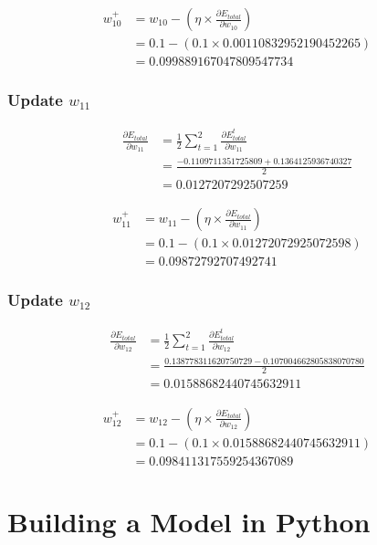 \documentclass{article}
\begin{document}
\begin{align*}
    w_{{10}}^{+} &= w_{10} - (\eta \times \frac{\partial E_{total}}{\partial w_{10}}) \\
    & = 0.1 - (0.1 \times 0.00110832952190452265) \\
    & = 0.099889167047809547734
\end{align*}
\subsubsection{Update $w_{11}$}
\begin{align*}
    \frac{\partial E_{total}}{\partial w_{11}} & =
        \frac{1}{2}
            \sum_{t=1}^{2}{
                \frac{\partial E_{total}^{t}}{\partial w_{11}}} \\
    & = \frac{-0.1109711351725809 + 0.1364125936740327}{2} \\
    & = 0.0127207292507259
\end{align*}

\begin{align*}
    w_{{11}}^{+} &= w_{11} - (\eta \times \frac{\partial E_{total}}{\partial w_{11}}) \\
    & = 0.1 - (0.1 \times 0.01272072925072598) \\
    & = 0.09872792707492741
\end{align*}
\subsubsection{Update $w_{12}$}
\begin{align*}
    \frac{\partial E_{total}}{\partial w_{12}} & =
        \frac{1}{2}
            \sum_{t=1}^{2}{
                \frac{\partial E_{total}^{t}}{\partial w_{12}}} \\
    & = \frac{0.138778311620750729 - 0.107004662805838070780}{2} \\
    & = 0.01588682440745632911
\end{align*}

\begin{align*}
    w_{{12}}^{+} &= w_{12} - (\eta \times \frac{\partial E_{total}}{\partial w_{12}}) \\
    & = 0.1 - (0.1 \times 0.01588682440745632911) \\
    & = 0.098411317559254367089
\end{align*}


\section{Building a Model in Python}
\end{document}
